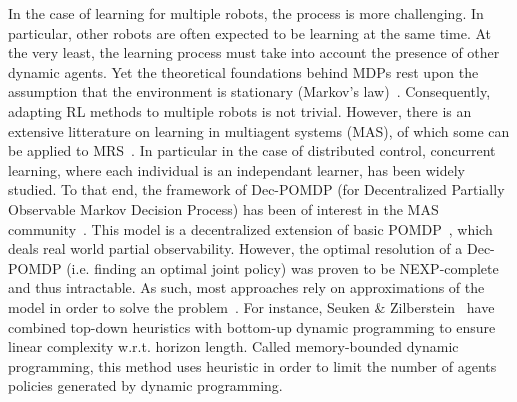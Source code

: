     In the case of learning for multiple robots, the process is more challenging. In particular, other robots are often expected to be learning at the same time. At the very least, the learning process must take into account the presence of other dynamic agents. Yet the theoretical foundations behind MDPs rest upon the assumption that the environment is stationary (Markov's law)~\parencite{Littman1994, Parker2008}. Consequently, adapting RL methods to multiple robots is not trivial. However, there is an extensive litterature on learning in multiagent systems (MAS), of which some can be applied to MRS~\parencite{Stone2000, Yang2005, Panait2005}. In particular in the case of distributed control, concurrent learning, where each individual is an independant learner, has been widely studied. To that end, the framework of Dec-POMDP (for Decentralized Partially Observable Markov Decision Process) has been of interest in the MAS community~\parencite{Bernstein2002, Amato2013}. This model is a decentralized extension of basic POMDP~\parencite{Astrom1965}, which deals real world partial observability. However, the optimal resolution of a Dec-POMDP (i.e. finding an optimal joint policy) was proven to be NEXP-complete~\parencite{Bernstein2002} and thus intractable. As such, most approaches rely on approximations of the model in order to solve the problem~\parencite{Amata2013}. For instance, Seuken \& Zilberstein~\parencite{Seuken2007} have combined top-down heuristics with bottom-up dynamic programming to ensure linear complexity w.r.t. horizon length. Called memory-bounded dynamic programming, this method uses heuristic in order to limit the number of agents policies generated by dynamic programming.


